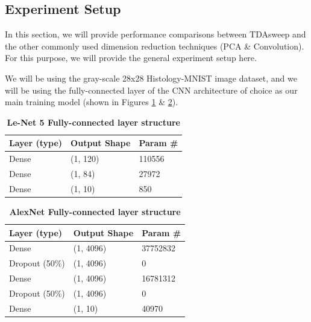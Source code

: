 \documentclass{article}
\begin{document}
\subsection{Experiment Setup}
In this section, we will provide performance comparisons between TDAsweep and the other commonly used dimension reduction techniques (PCA \& Convolution). For this purpose, we will provide the general experiment setup here.

We will be using the gray-scale 28x28 Histology-MNIST image dataset, and we will be using the fully-connected layer of the CNN architecture of choice as our main training model (shown in Figures \ref{le_ful} \& \ref{alex_ful}).


\begin{table}[!ht]
\centering
\caption{{\bf Le-Net 5 Fully-connected layer structure}}
\begin{tabular}{l|l|l}
\hline
\multicolumn{1}{l|}{\bf Layer (type)} & \multicolumn{1}{|l|}{\bf Output Shape} & \multicolumn{1}{|l}{\bf Param \#}\\ \hline
Dense & (1, 120) & 110556 \\ \hline
Dense & (1, 84) & 27972  \\ \hline
Dense & (1, 10) & 850  \\ \hline

\end{tabular}
\label{le_ful}
\end{table}

\begin{table}[!ht]
\centering
\caption{{\bf AlexNet Fully-connected layer structure}}
\begin{tabular}{l|l|l}
\hline
\multicolumn{1}{l|}{\bf Layer (type)} & \multicolumn{1}{|l|}{\bf Output Shape} & \multicolumn{1}{|l}{\bf Param \#}\\ \hline
Dense & (1, 4096) & 37752832 \\ \hline
Dropout (50\%) & (1, 4096) & 0 \\ \hline
Dense & (1, 4096) & 16781312  \\ \hline
Dropout (50\%) & (1, 4096) & 0 \\ \hline
Dense & (1, 10) & 40970  \\ \hline

\end{tabular}
\label{alex_ful}
\end{table}
\end{document}
